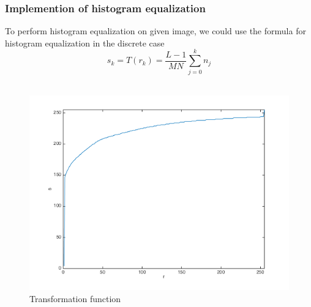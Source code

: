\subsubsection{Implemention of histogram equalization}
To perform histogram equalization on given image, we could use the formula for histogram equalization in the discrete case
$$ s_k = T(r_k) = \frac{L - 1}{MN}\sum_{j = 0}^{k} n_j $$
\\[10cm]
\begin{figure}[h]
	\centering
	\includegraphics[scale=0.4]{hetrans}
	\caption{Transformation function}
	\label{fig:hetrans}
\end{figure}

